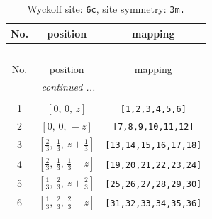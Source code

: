 \documentclass[fleqn,8pt]{jsarticle}
\begin{document}
\renewcommand{\arraystretch}{1.2}
\begin{longtable}{ccc}
\caption{Wyckoff site: {\tt 6c}, site symmetry: {\tt 3m.}}
 \\
 \hline \hline
No. & position & mapping \\ \hline \endfirsthead

\multicolumn{2}{l}{\tablename\ \thetable{}} \\
 \hline \hline
No. & position & mapping \\ \hline \endhead

 \hline \hline
\multicolumn{2}{r}{\footnotesize\it continued ...} \\ \endfoot

 \hline \hline
\multicolumn{2}{r}{} \\ \endlastfoot

1 & $\left[ 0,\, 0,\, z \right]$ & {\tt [1,2,3,4,5,6]} \\ \hline
2 & $\left[ 0,\, 0,\, - z \right]$ & {\tt [7,8,9,10,11,12]} \\ \hline
3 & $\left[ \frac{2}{3},\, \frac{1}{3},\, z + \frac{1}{3} \right]$ & {\tt [13,14,15,16,17,18]} \\ \hline
4 & $\left[ \frac{2}{3},\, \frac{1}{3},\, \frac{1}{3} - z \right]$ & {\tt [19,20,21,22,23,24]} \\ \hline
5 & $\left[ \frac{1}{3},\, \frac{2}{3},\, z + \frac{2}{3} \right]$ & {\tt [25,26,27,28,29,30]} \\ \hline
6 & $\left[ \frac{1}{3},\, \frac{2}{3},\, \frac{2}{3} - z \right]$ & {\tt [31,32,33,34,35,36]} \\
\end{longtable}
\renewcommand{\arraystretch}{1.2}
\end{document}
